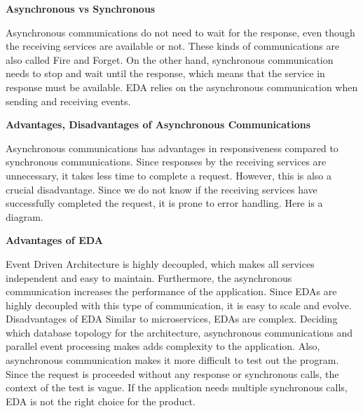 \noindent \textbf{Asynchronous vs Synchronous}

Asynchronous communications do not need to wait for the response, even though the receiving services are available or not. These kinds of communications are also called Fire and Forget. On the other hand, synchronous communication needs to stop and wait until the response, which means that the service in response must be available. EDA relies on the asynchronous communication when sending and receiving events.

\noindent \textbf{Advantages, Disadvantages of Asynchronous Communications}

Asynchronous communications has advantages in responsiveness compared to synchronous communications. Since responses by the receiving services are unnecessary, it takes less time to complete a request. However, this is also a crucial disadvantage. Since we do not know if the receiving services have successfully completed the request, it is prone to error handling. Here is a diagram. 

\noindent \textbf{Advantages of EDA}

Event Driven Architecture is highly decoupled, which makes all services independent and easy to maintain. Furthermore, the asynchronous communication increases the performance of the application. Since EDAs are highly decoupled with this type of communication, it is easy to scale and evolve. 
Disadvantages of EDA
Similar to microservices, EDAs are complex. Deciding which database topology for the architecture, asynchronous communications and parallel event processing makes adds complexity to the application. Also, asynchronous communication makes it more difficult to test out the program. Since the request is proceeded without any response or synchronous calls, the context of the test is vague. If the application needs multiple synchronous calls, EDA is not the right choice for the product. 

